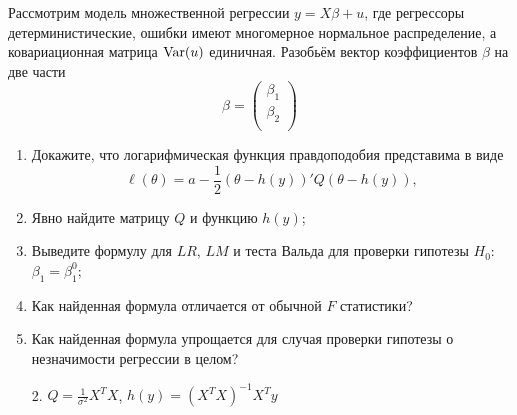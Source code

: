 \begin{problem}
  Рассмотрим модель множественной регрессии $y = X\beta + u$, где регрессоры детерминистические,
  ошибки имеют многомерное нормальное распределение,
  а ковариационная матрица $\operatorname{Var}(u)$ единичная. Разобьём вектор коэффициентов $\beta$ на две части
  \[
    \beta = \begin{pmatrix}
      \beta_1 \\
      \beta_2 \\
    \end{pmatrix}
  \]

  \begin{enumerate}
    \item Докажите, что логарифмическая функция правдоподобия представима в виде
\[
     \ell(\theta) = a - \frac{1}{2}(\theta - h(y))' Q (\theta - h(y)),
  \]
\item Явно найдите матрицу $Q$ и функцию $h(y)$;
\item Выведите формулу для $LR$, $LM$ и теста Вальда для проверки гипотезы $H_0$: $\beta_1 = \beta_1^0$;
\item Как найденная формула отличается от обычной $F$ статистики?
\item Как найденная формула упрощается для случая проверки гипотезы о незначимости регрессии в целом?
  \end{enumerate}

\begin{sol}
\begin{enumerate}
\item[2.] $Q = \frac{1}{\sigma^2} X^T X$, $h(y) = (X^T X)^{-1} X^T y$
\end{enumerate}
\end{sol}
\end{problem}



